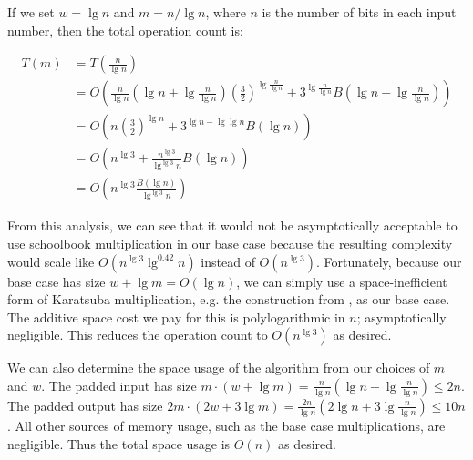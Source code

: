 \documentclass[onecolumn]{quantumarticle}
\begin{document}
If we set $w=\lg n$ and $m=n/\lg n$, where $n$ is the number of bits in each input number, then the total operation count is:

\begin{equation}
    \begin{aligned}
T(m) &= T\left(\frac{n}{\lg n}\right)
\\   &= O\left(\frac{n}{\lg n} \left(\lg n + \lg \frac{n}{\lg n}\right) \left(\frac{3}{2}\right)^{\lg \frac{n}{\lg n}} + 3^{\lg \frac{n}{\lg n}} B\left(\lg n + \lg \frac{n}{\lg n}\right)\right)
\\   &= O\left(n \left(\frac{3}{2}\right)^{\lg n} + 3^{\lg n - \lg \lg n} B(\lg n)\right)
\\   &= O\left(n^{\lg 3} + \frac{n^{\lg 3}}{\lg^{\lg 3} n} B(\lg n)\right)
\\   &= O\left(n^{\lg 3} \frac{B(\lg n)}{\lg^{\lg 3} n}\right)
    \end{aligned}
\end{equation}

From this analysis, we can see that it would not be asymptotically acceptable to use schoolbook multiplication in our base case because the resulting complexity would scale like $O(n^{\lg 3} \lg^{0.42} n)$ instead of $O(n^{\lg 3})$.
Fortunately, because our base case has size $w + \lg m = O(\lg n)$, we can simply use a space-inefficient form of Karatsuba multiplication, e.g. the construction from \cite{parent2017karatsuba}, as our base case.
The additive space cost we pay for this is polylogarithmic in $n$; asymptotically negligible.
This reduces the operation count to $O(n^{\lg 3})$ as desired.

We can also determine the space usage of the algorithm from our choices of $m$ and $w$.
The padded input has size $m \cdot (w + \lg m) = \frac{n}{\lg n} (\lg n + \lg \frac{n}{\lg n}) \leq 2 n$.
The padded output has size $2m \cdot (2w + 3 \lg m) = \frac{2n}{\lg n} (2 \lg n + 3 \lg \frac{n}{\lg n}) \leq 10 n$.
All other sources of memory usage, such as the base case multiplications, are negligible.
Thus the total space usage is $O(n)$ as desired.
\end{document}
